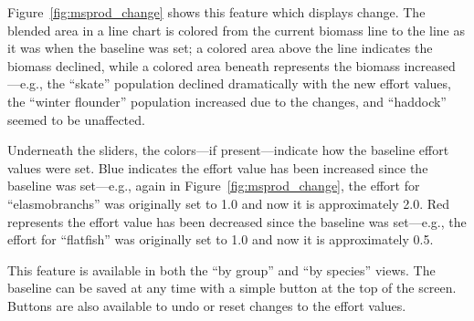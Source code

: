 Figure~\ref{fig:msprod_change} shows this feature which displays change.  The blended area in a line chart is colored from the current biomass line to the line as it was when the baseline was set; a colored area above the line indicates the biomass declined, while a colored area beneath represents the biomass increased---e.g., the ``skate'' population declined dramatically with the new effort values, the ``winter flounder'' population increased due to the changes, and ``haddock'' seemed to be unaffected.

Underneath the sliders, the colors---if present---indicate how the baseline effort values were set.  Blue indicates the effort value has been increased since the baseline was set---e.g., again in Figure~\ref{fig:msprod_change}, the effort for ``elasmobranchs'' was originally set to 1.0 and now it is approximately 2.0.  Red represents the effort value has been decreased since the baseline was set---e.g., the effort for ``flatfish'' was originally set to 1.0 and now it is approximately 0.5.

This feature is available in both the ``by group'' and ``by species'' views.  The baseline can be saved at any time with a simple button at the top of the screen.  Buttons are also available to undo or reset changes to the effort values.
